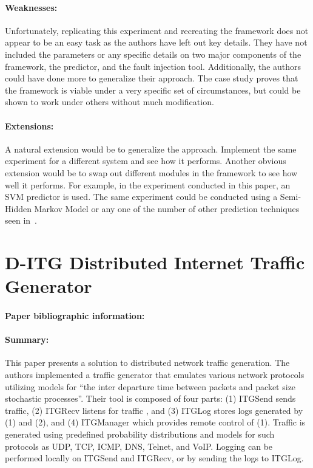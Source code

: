 \documentclass[11pt]{article}
\begin{document}
\paragraph{Weaknesses:}  Unfortunately, replicating this experiment and
recreating the framework does not appear to be an easy task as the authors have
left out key details.  They have not included the parameters or any specific
details on two major components of the framework, the predictor, and the fault
injection tool.  Additionally, the authors could have done more to generalize
their approach.  The case study proves that the framework is viable under a
very specific set of circumstances, but could be shown to work under others
without much modification.

\paragraph{Extensions:}  A natural extension would be to generalize the
approach.  Implement the same experiment for a different system and see how it
performs.  Another obvious extension would be to swap out different modules in
the framework to see how well it performs.  For example, in the experiment
conducted in this paper, an SVM predictor is used.  The same experiment could
be conducted using a Semi-Hidden Markov Model or any one of the number of other
prediction techniques seen in~\cite{salfnerSurvey}.

\newpage
\section{D-ITG Distributed Internet Traffic Generator}
\paragraph{Paper bibliographic information:}
\paragraph{Summary:}  This paper presents a solution to distributed network traffic generation.  The authors implemented a traffic generator that emulates various network protocols utilizing models for ``the inter departure time between packets and packet size stochastic processes''\cite{Avallone2004}.  Their tool is composed of four parts: (1) ITGSend sends traffic, (2) ITGRecv listens for traffic , and (3) ITGLog stores logs generated by (1) and (2), and (4) ITGManager which provides remote control of (1).  Traffic is generated using predefined probability distributions and models for such protocols as UDP, TCP, ICMP, DNS, Telnet, and VoIP.  Logging can be performed locally on ITGSend and ITGRecv, or by sending the logs to ITGLog.\\
\end{document}
